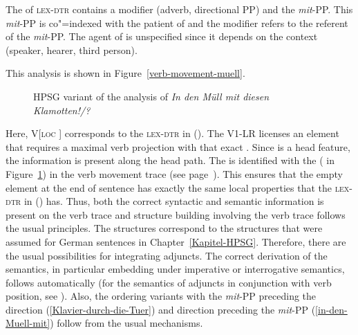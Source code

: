 \begin{exe}
\begin{xlist}[iv.]
\begin{exe}
\begin{xlist}[iv.]
The \compsl of \textsc{lex-dtr} contains a modifier (adverb, directional PP) and the 
\emph{mit}-PP. This \emph{mit}-PP is co"=indexed with the patient of  and the modifier refers to the referent of the \emph{mit}-PP. The agent
of  is unspecified since it depends on the context (speaker, hearer, third person).

This analysis is shown in Figure~\vref{verb-movement-muell}.
\begin{figure}[t]
\caption{\label{verb-movement-muell}HPSG variant of the analysis of \emph{In den Müll mit diesen Klamotten!/?}}
\end{figure}%
Here, V[\textsc{loc} ] corresponds to the \textsc{lex-dtr} in (). The V1-LR licenses an element that requires a maximal verb projection
with that exact \dslv {}. Since \dsl is a head feature, the information is present along the head path. The \dslv is identified with the \localv
( in Figure~\ref{verb-movement-muell}) in the verb movement trace (see page~\pageref{le-verbspur}). 
This ensures that the empty element at the end of sentence has exactly the same local properties that the \textsc{lex-dtr} in () has.
Thus, both the correct syntactic and semantic information is present on the verb trace and structure
building involving the verb trace follows the usual principles.
The structures correspond to the structures that were assumed for German sentences in Chapter~\ref{Kapitel-HPSG}.
Therefore, there are the usual possibilities for integrating adjuncts. The correct derivation of the semantics, in particular embedding under
imperative or interrogative semantics, follows automatically (for the semantics of adjuncts in conjunction with verb position, see  ). 
Also, the ordering variants with the \emph{mit}-PP preceding the direction (\ref{Klavier-durch-die-Tuer}) and direction preceding the 
\emph{mit}-PP (\ref{in-den-Muell-mit}) follow from the usual mechanisms.


\end{xlist}
\end{exe}
\end{xlist}
\end{exe}
